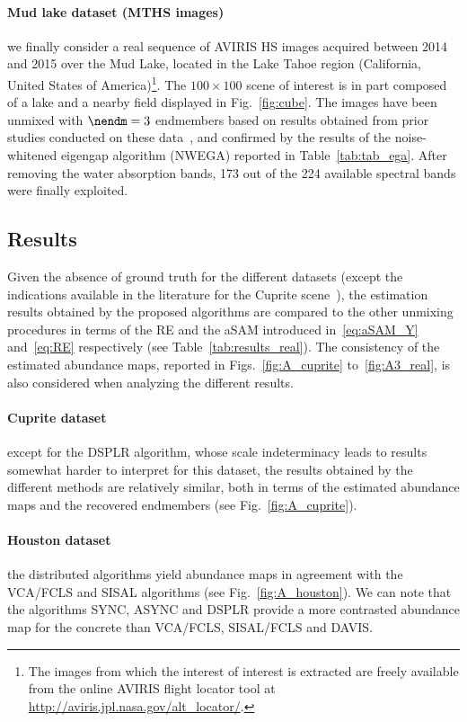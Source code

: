 \documentclass[journal,final,letterpaper,twoside,twocolumn]{IEEEtran}
\begin{document}
        \paragraph{Mud lake dataset (MTHS images)}
we finally consider a real sequence of AVIRIS HS images acquired between 2014 and 2015 over the Mud Lake, located in the Lake Tahoe region (California, United States of America)\footnote{The images from which the interest of interest is extracted are freely available from the online AVIRIS flight locator tool at \url{http://aviris.jpl.nasa.gov/alt_locator/}.}. The $100 \times 100$ scene of interest is in part composed of a lake and a nearby field displayed in Fig.~\ref{fig:cube}. The images have been unmixed with $\nendm = 3$ endmembers based on results obtained from prior studies conducted on these data~\cite{Thouvenin2015b,Thouvenin2015TR}, and confirmed by the results of the noise-whitened eigengap algorithm (NWEGA) \cite{Halimi2016} reported in Table~\ref{tab:tab_ega}. After removing the water absorption bands, 173 out of the 224 available spectral bands were finally exploited.

	\subsection{Results}
	
	

Given the absence of ground truth for the different datasets (except the indications available in the literature for the Cuprite scene~\cite{Nascimento2005,Miao2007}), the estimation results obtained by the proposed algorithms are compared to the other unmixing procedures in terms of the RE and the aSAM introduced in~\eqref{eq:aSAM_Y} and~\eqref{eq:RE} respectively (see Table~\ref{tab:results_real}). The consistency of the estimated abundance maps, reported in Figs.~\ref{fig:A_cuprite} to~\ref{fig:A3_real}, is also considered when analyzing the different results.

	   \paragraph{Cuprite dataset}
except for the DSPLR algorithm, whose scale indeterminacy leads to results somewhat harder to interpret for this dataset, the results obtained by the different methods are relatively similar, both in terms of the estimated abundance maps and the recovered endmembers (see Fig.~\ref{fig:A_cuprite}).

	   \paragraph{Houston dataset}
the distributed algorithms yield abundance maps in agreement with the VCA/FCLS and SISAL algorithms (see Fig.~\ref{fig:A_houston}). We can note that the algorithms SYNC, ASYNC and DSPLR provide a more contrasted abundance map for the concrete than VCA/FCLS, SISAL/FCLS and DAVIS.
\end{document}
